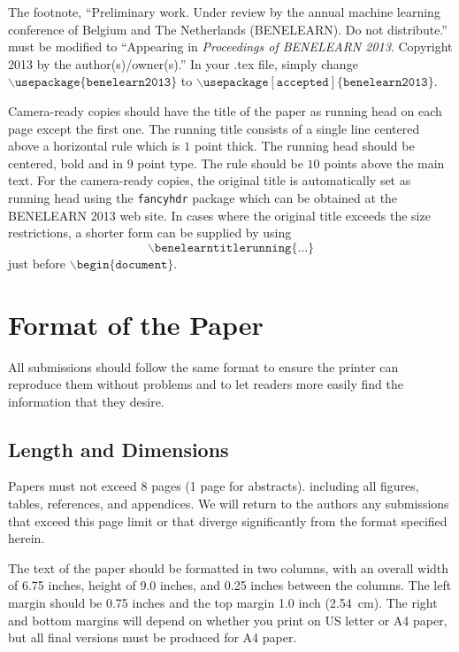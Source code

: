 \documentclass{article}
\begin{document}
The footnote, ``Preliminary work.  Under review by the annual machine learning conference of Belgium and The Netherlands (BENELEARN). Do not distribute.'' must be
modified to ``Appearing in \textit{Proceedings of BENELEARN 2013}. Copyright 2013 by the author(s)/owner(s).'' In your .tex file, simply change
$\mathtt{\backslash usepackage\{benelearn2013\}}$ to $\mathtt{\backslash
usepackage[accepted]\{benelearn2013\}}$.  

Camera-ready copies should have the title of the paper as running head on each page except the first one.  The running title consists of a single line centered above a horizontal rule which is $1$ point thick. The running head should be centered, bold and in $9$ point type.  The rule should be $10$ points above the main text.  For the camera-ready copies, the original title is automatically set as running head using the {\tt fancyhdr} package which can be obtained at the BENELEARN 2013 web site. In cases where the original title exceeds the size restrictions, a shorter form can be supplied by using
$$\mathtt{\backslash benelearntitlerunning\{\ldots\}}$$
just before $\mathtt{\backslash begin\{document\}}$.

\section{Format of the Paper}

All submissions should follow the same format to ensure the printer can reproduce them without problems and to let readers more easily find the information that they desire.

\subsection{Length and Dimensions}

Papers must not exceed 8 pages (1 page for abstracts).
including all figures, tables, references, and appendices. We will return to the authors any submissions that exceed this page limit or that diverge significantly from the format specified herein.

The text of the paper should be formatted in two columns, with an overall width of 6.75 inches, height of 9.0 inches, and 0.25 inches between the columns. The left margin should be 0.75 inches and the top margin 1.0 inch (2.54~cm). The right and bottom margins will depend on whether you print on US letter or A4 paper, but all final versions must be produced for A4 paper.
\end{document}
